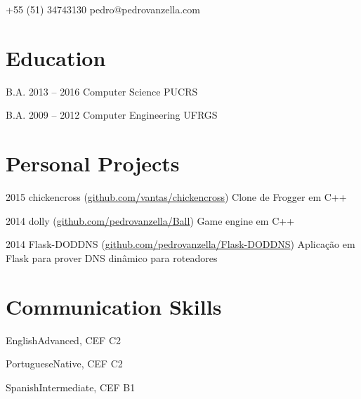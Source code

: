 \documentclass{tccv}
\begin{document}
    {+55 (51) 34743130}
    {pedro@pedrovanzella.com}

\section{Education}

\begin{yearlist}

\item[B.A.]{2013 -- 2016}
     {Computer Science}
     {PUCRS}

\item[B.A.]{2009 -- 2012}
     {Computer Engineering}
     {UFRGS}

\end{yearlist}

\section{Personal Projects}

\begin{yearlist}
  
\item{2015}
     {chickencross (\href{https://github.com/vantas/chickencross}{github.com/vantas/chickencross})}
     {Clone de Frogger em C++}

\item{2014}
     {dolly (\href{https://github.com/pedrovanzella/Ball}{github.com/pedrovanzella/Ball})}
     {Game engine em C++}

\item{2014}
     {Flask-DODDNS (\href{https://github.com/pedrovanzella/Flask-DODDNS}{github.com/pedrovanzella/Flask-DODDNS})}
     {Aplicação em Flask para prover DNS dinâmico para roteadores}

\end{yearlist}

\section{Communication Skills}

\begin{factlist}
\item{English}{Advanced, CEF C2}
\item{Portuguese}{Native, CEF C2}
\item{Spanish}{Intermediate, CEF B1}
\end{factlist}
\end{document}
